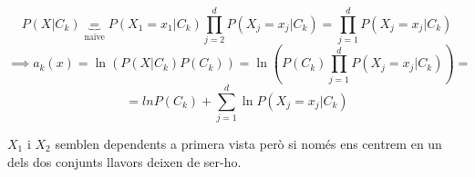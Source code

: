 \documentclass[a4paper]{article}
\begin{document}
$$
P(X|C_k) \underbrace{=}_{\text{naïve}} P(X_1=x_1|C_k) 
\prod_{j=2}^d P(X_j=x_j|C_k) = \prod_{j=1}^d P(X_j=x_j|C_k)
$$
$$
\implies a_k(x) = \ln(P(X|C_k)P(C_k)) = 
\ln\left(P(C_k)\prod_{j=1}^d P(X_j=x_j|C_k)\right) =
$$
$$
= ln P(C_k) + \sum_{j=1}^d \ln P(X_j=x_j|C_k)
$$


$X_1$ i $X_2$ semblen dependents a primera vista però si només ens centrem en un dels dos conjunts llavors deixen de ser-ho.
\end{document}
